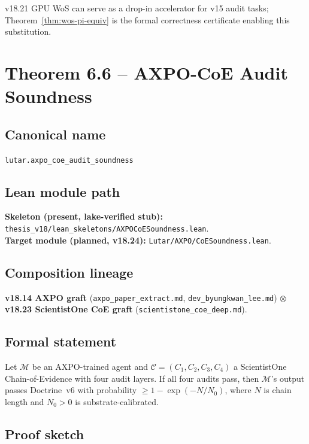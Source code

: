 v18.21 GPU WoS can serve as a drop-in accelerator for v15 audit
tasks; Theorem~\ref{thm:wos-pi-equiv} is the formal correctness
certificate enabling this substitution.

\section{Theorem 6.6 -- AXPO-CoE Audit Soundness}
\label{sec:thm06}

\subsection*{Canonical name}
\verb|lutar.axpo_coe_audit_soundness|

\subsection*{Lean module path}
\textbf{Skeleton (present, lake-verified stub):}
\texttt{thesis\_v18/lean\_skeletons/AXPOCoESoundness.lean}.\\
\textbf{Target module (planned, v18.24):}
\texttt{Lutar/AXPO/CoESoundness.lean}.

\subsection*{Composition lineage}
\textbf{v18.14 AXPO graft}
(\texttt{axpo\_paper\_extract.md},
\texttt{dev\_byungkwan\_lee.md}) $\otimes$
\textbf{v18.23 ScientistOne CoE graft}
(\texttt{scientistone\_coe\_deep.md}).

\subsection*{Formal statement}

\begin{theorem}
\label{thm:axpo-coe}
Let $\mathcal{M}$ be an AXPO-trained agent and
$\mathcal{C} = (C_1, C_2, C_3, C_4)$ a ScientistOne
Chain-of-Evidence with four audit layers.
If all four audits pass, then $\mathcal{M}$'s output passes
Doctrine~v6 with probability
$\geq 1 - \exp(-N/N_0)$,
where $N$ is chain length and $N_0 > 0$ is substrate-calibrated.
\end{theorem}

\subsection*{Proof sketch}

